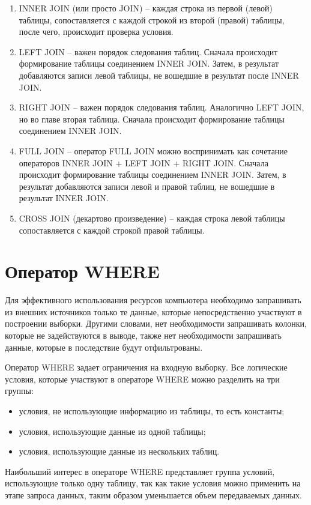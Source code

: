 \begin{enumerate}
	\item INNER JOIN (или просто JOIN) -- каждая строка из первой (левой) таблицы, сопоставляется с каждой строкой из второй (правой) таблицы, после чего, происходит проверка условия. 
	\item LEFT JOIN -- важен порядок следования таблиц. Сначала происходит формирование таблицы соединением INNER JOIN. Затем, в результат добавляются записи левой таблицы, не вошедшие в результат после INNER JOIN. 
	\item RIGHT JOIN -- важен порядок следования таблиц. Аналогично LEFT JOIN, но во главе вторая таблица. Сначала происходит формирование таблицы соединением INNER JOIN.
	\item FULL JOIN -- оператор FULL JOIN можно воспринимать как сочетание операторов INNER JOIN + LEFT JOIN + RIGHT JOIN. Сначала происходит формирование таблицы соединением \newline INNER JOIN. Затем, в результат добавляются записи левой и правой таблиц, не вошедшие в результат INNER JOIN.
	\item CROSS JOIN (декартово произведение) -- каждая строка левой таблицы сопоставляется с каждой строкой правой таблицы.  
\end{enumerate}

\section{Оператор WHERE}

Для эффективного использования ресурсов компьютера необходимо запрашивать из внешних источников только те данные, которые непосредственно участвуют в построении выборки. Другими словами, нет необходимости запрашивать колонки, которые не задействуются в выводе, также нет необходимости запрашивать данные, которые в последствие будут отфильтрованы.

Оператор WHERE задает ограничения на входную выборку. Все логические условия, которые участвуют в операторе WHERE можно разделить на три группы:
\begin{itemize}
	\item условия, не использующие информацию из таблицы, то есть константы;
	\item условия, использующие данные из одной таблицы;
	\item условия, использующие данные из нескольких таблиц.
\end{itemize}

Наибольший интерес в операторе WHERE представляет группа условий, использующие только одну таблицу, так как такие условия можно применить на этапе запроса данных, таким образом уменьшается объем передаваемых данных.


